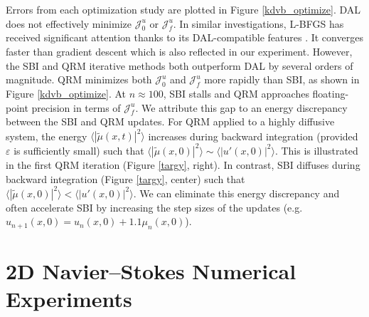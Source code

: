 \documentclass[%
 reprint,
 amsmath,amssymb,
 aps,
 pre,
]{revtex4-2}
\newcommand\tmu{\tilde{\mu}}
\newcommand{\Juo}{\mathcal{J}^{u}_0}
\newcommand{\Juf}{\mathcal{J}^{u}_f}
\begin{document}
Errors from each optimization study are plotted in Figure \ref{kdvb_optimize}.
DAL does not effectively minimize $\Juo$ or $\Juf$.
In similar investigations, L-BFGS has received significant attention thanks to its DAL-compatible features \cite{Li2017}. 
It converges faster than gradient descent which is also reflected in our experiment.
However, the SBI and QRM iterative methods both outperform DAL by several orders of magnitude.
QRM minimizes both $\Juo$ and $\Juf$ more rapidly than SBI, as shown in Figure \ref{kdvb_optimize}.
At $n\approx 100$, SBI stalls and QRM approaches floating-point precision in terms of $\Juf$.
We attribute this gap to an energy discrepancy between the SBI and QRM updates.
For QRM applied to a highly diffusive system, the energy $\langle|\tmu(x,t)|^2\rangle$ increases during backward integration (provided $\varepsilon$ is sufficiently small) such that $\langle|\tmu(x,0)|^2\rangle \sim \langle|u'(x,0)|^2\rangle$.
This is illustrated in the first QRM iteration (Figure \ref{targy}, right).
In contrast, SBI diffuses during backward integration (Figure \ref{targy}, center) such that $\langle|\tmu(x,0)|^2\rangle < \langle|u'(x,0)|^2\rangle$.
We can eliminate this energy discrepancy and often accelerate SBI by increasing the step sizes of the updates (e.g.~$u_{n+1}(x,0)=u_{n}(x,0)+1.1\mu_{n}(x,0)$).

\section{2D Navier--Stokes Numerical Experiments}\label{secNS}
\end{document}
